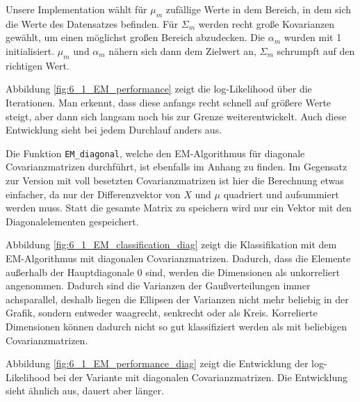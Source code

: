 Unsere Implementation wählt für $\mu_m$ zufällige Werte in dem Bereich, in dem sich die Werte des Datensatzes befinden. Für $\Sigma_m$ werden recht große Kovarianzen gewählt, um einen möglichst großen Bereich abzudecken. Die $\alpha_m$ wurden mit 1 initialisiert. $\mu_m$ und $\alpha_m$ nähern sich dann dem Zielwert an, $\Sigma_m$ schrumpft auf den richtigen Wert.

Abbildung \ref{fig:6_1_EM_performance} zeigt die log-Likelihood über die Iterationen. Man erkennt, dass diese anfangs recht schnell auf größere Werte steigt, aber dann sich langsam noch bis zur Grenze weiterentwickelt. Auch diese Entwicklung sieht bei jedem Durchlauf anders aus.

Die Funktion \texttt{EM_diagonal}, welche den EM-Algorithmus für diagonale Covarianzmatrizen durchführt, ist ebenfalls im Anhang zu finden. Im Gegensatz zur Version mit voll besetzten Covarianzmatrizen ist hier die Berechnung etwas einfacher, da nur der Differenzvektor von $X$ und $\mu$ quadriert und aufsummiert werden muss. Statt die gesamte Matrix zu speichern wird nur ein Vektor mit den Diagonalelementen gespeichert.

Abbildung \ref{fig:6_1_EM_classification_diag} zeigt die Klassifikation mit dem EM-Algorithmus mit diagonalen Covarianzmatrizen. Dadurch, dass die Elemente außerhalb der Hauptdiagonale 0 sind, werden die Dimensionen als unkorreliert angenommen. Dadurch sind die Varianzen der Gaußverteilungen immer achsparallel, deshalb liegen die Ellipsen der Varianzen nicht mehr beliebig in der Grafik, sondern entweder waagrecht, senkrecht oder als Kreis. Korrelierte Dimensionen können dadurch nicht so gut klassifiziert werden als mit beliebigen Covarianzmatrizen.

Abbildung \ref{fig:6_1_EM_performance_diag} zeigt die Entwicklung der log-Likelihood bei der Variante mit diagonalen Covarianzmatrizen. Die Entwicklung sieht ähnlich aus, dauert aber länger.


